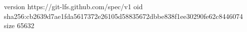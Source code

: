 version https://git-lfs.github.com/spec/v1
oid sha256:cb2639d7ae1fda5617372e26105d58835672dbbe838f1ee30290fe62c8446074
size 65632

